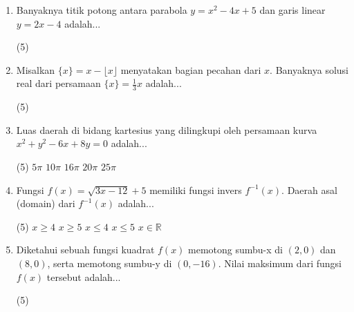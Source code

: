 \documentclass[12pt]{scrartcl}
\begin{document}
\begin{enumerate}
\item Banyaknya titik potong antara parabola $y = x^2 - 4x + 5$ dan garis linear $y = 2x - 4$ adalah...

\begin{tasks}[label=\Alph*](5)     
\end{tasks}

\item Misalkan $\{x\} = x - \lfloor x \rfloor$ menyatakan bagian pecahan dari $x$. Banyaknya solusi real dari persamaan $\{x\} = \frac{1}{3}x$ adalah...

\begin{tasks}[label=\Alph*](5)     
\end{tasks}

\item Luas daerah di bidang kartesius yang dilingkupi oleh persamaan kurva $x^2 + y^2 - 6x + 8y = 0$ adalah...

\begin{tasks}[label=\Alph*](5) \task $5\pi$ \task $10\pi$ \task $16\pi$ \task $20\pi$ \task $25\pi$
\end{tasks}

\item Fungsi $f(x) = \sqrt{3x - 12} + 5$ memiliki fungsi invers $f^{-1}(x)$. Daerah asal (domain) dari $f^{-1}(x)$ adalah...

\begin{tasks}[label=\Alph*](5) \task $x \ge 4$ \task $x \ge 5$ \task $x \le 4$ \task $x \le 5$ \task $x \in \mathbb{R}$
\end{tasks}

\item Diketahui sebuah fungsi kuadrat $f(x)$ memotong sumbu-x di $(2,0)$ dan $(8,0)$, serta memotong sumbu-y di $(0, -16)$. Nilai maksimum dari fungsi $f(x)$ tersebut adalah...

\begin{tasks}[label=\Alph*](5)     
\end{tasks}




\end{enumerate}
\end{document}
